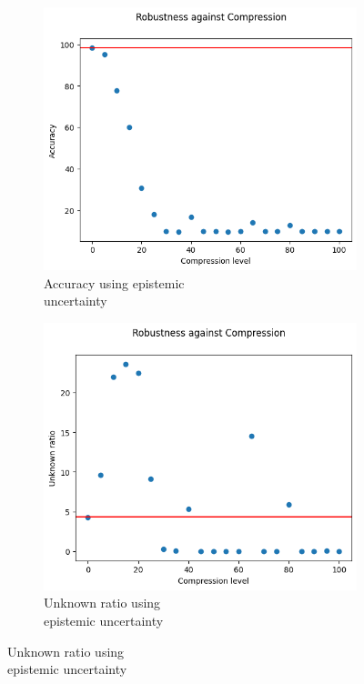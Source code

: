 \begin{figure}[h]
	\centering
	\begin{subfigure}{.33\textwidth}
		\centering
		\includegraphics[width=0.9\linewidth]{ImageFiles/EvalBNN/CO/EU/acc}
		\caption{Accuracy using epistemic \\ uncertainty}
		\label{fig:co_eu_acc}
	\end{subfigure}%
	\begin{subfigure}{.33\textwidth}
		\centering
		\includegraphics[width=0.9\linewidth]{ImageFiles/EvalBNN/CO/EU/unkn}
		\caption{Unknown ratio using \\ epistemic uncertainty}
		\label{fig:co_eu_unkn}
	\end{subfigure}%

\end{figure}
